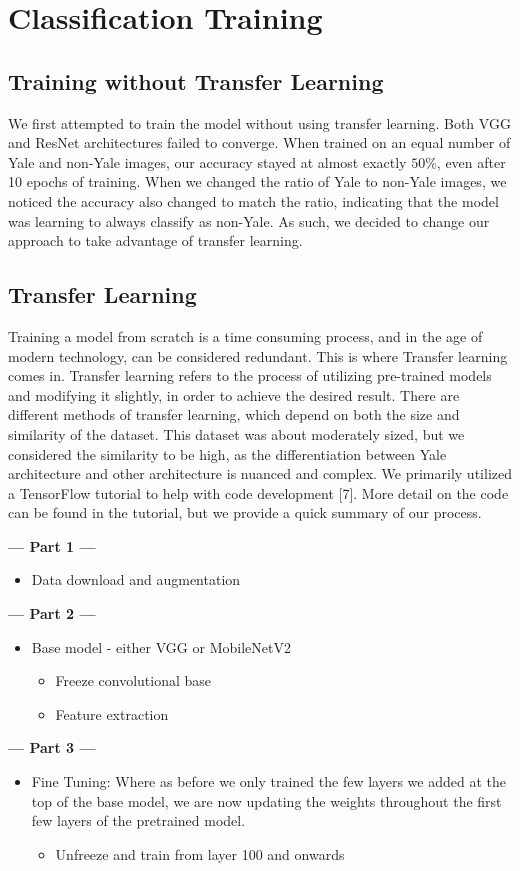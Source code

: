 \documentclass[letterpaper]{article} %
\begin{document}
\section{Classification Training}
\subsection{Training without Transfer Learning}
We first attempted to train the model without using transfer learning. Both VGG and ResNet architectures failed to converge. When trained on an equal number of Yale and non-Yale images, our accuracy stayed at almost exactly $50\%$, even after 10 epochs of training. When we changed the ratio of Yale to non-Yale images, we noticed the accuracy also changed to match the ratio, indicating that the model was learning to always classify as non-Yale. As such, we decided to change our approach to take advantage of transfer learning.

\subsection{Transfer Learning}
Training a model from scratch is a time consuming process, and in the age of modern technology, can be considered redundant. This is where Transfer learning comes in. Transfer learning refers to the process of utilizing pre-trained models and modifying it slightly, in order to achieve the desired result. There are different methods of transfer learning, which depend on both the size and similarity of the dataset. This dataset was about moderately sized, but we considered the similarity to be high, as the differentiation between Yale architecture and other architecture is nuanced and complex. We primarily utilized a TensorFlow tutorial to help with code development [7]. More detail on the code can be found in the tutorial, but we provide a quick summary of our process. 



\noindent\textbf{--- Part 1 ---}
\begin{itemize}
    \item Data download and augmentation
\end{itemize}
\textbf{--- Part 2 ---}
\begin{itemize}
    \item Base model - either VGG or MobileNetV2
    \begin{itemize}
        \item Freeze convolutional base
        \item Feature extraction
    \end{itemize}
\end{itemize}
\textbf{--- Part 3 ---}
\begin{itemize}
    \item Fine Tuning: Where as before we only trained the few layers we added at the top of the base model, we are now updating the weights throughout the first few layers of the pretrained model.
    \begin{itemize}
        \item Unfreeze and train from layer 100 and onwards
    \end{itemize}
\end{itemize}
\end{document}
